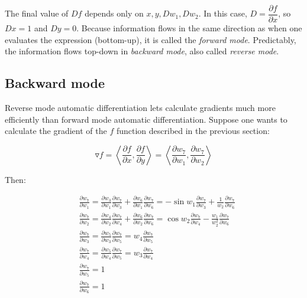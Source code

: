 \documentclass{pracamgr}
\numberwithin{equation}{section}
\begin{document}
The final value of $Df$ depends only on $x, y, Dw_{1}, Dw_{2}$. In this case, $ D = \dfrac{\partial f}{\partial x}$, so $Dx = 1$ and $Dy = 0$. Because information flows in the same direction as when one evaluates the expression (bottom-up), it is called the \textit{forward mode}. Predictably, the information flows top-down in  \textit{backward mode}, also called \textit{reverse mode}.

\subsection{Backward mode}

Reverse mode automatic differentiation lets calculate gradients much more efficiently than forward mode automatic differentiation. Suppose one wants to calculate the gradient of the $f$ function described in the previous section:

\[ \triangledown f = \left<\frac{\partial f}{\partial x}, \frac{\partial f}{\partial y}\right> = \left<\frac{\partial w_{7}}{\partial w_{1}}, \frac{\partial w_{7}}{\partial w_{2}}\right> \]

Then:

\begin{align*}
& \frac{\partial w_{7}}{\partial w_{1}} = \frac{\partial w_{3}}{\partial w_{1}} \frac{\partial w_{7}}{\partial w_{3}} + \frac{\partial w_{6}}{\partial w_{1}} \frac{\partial w_{7}}{\partial w_{6}} = -\sin w_{1} \frac{\partial w_{7}}{\partial w_{3}} + \frac{1}{w_{2}} \frac{\partial w_{7}}{\partial w_{6}} \\
& \frac{\partial w_{7}}{\partial w_{2}} = \frac{\partial w_{4}}{\partial w_{2}} \frac{\partial w_{7}}{\partial w_{4}} + \frac{\partial w_{6}}{\partial w_{2}} \frac{\partial w_{7}}{\partial w_{6}} = \cos w_{2} \frac{\partial w_{7}}{\partial w_{4}} - \frac{w_{1}}{w_{2}^{2}} \frac{\partial w_{7}}{\partial w_{6}} \\
& \frac{\partial w_{7}}{\partial w_{3}} = \frac{\partial w_{5}}{\partial w_{3}} \frac{\partial w_{7}}{\partial w_{5}} = w_{4} \frac{\partial w_{7}}{\partial w_{5}} \\
& \frac{\partial w_{7}}{\partial w_{4}} = \frac{\partial w_{5}}{\partial w_{4}} \frac{\partial w_{7}}{\partial w_{5}} = w_{3} \frac{\partial w_{7}}{\partial w_{4}} \\
& \frac{\partial w_{7}}{\partial w_{5}} = 1 \\
& \frac{\partial w_{7}}{\partial w_{6}} = 1
\end{align*}
\end{document}
